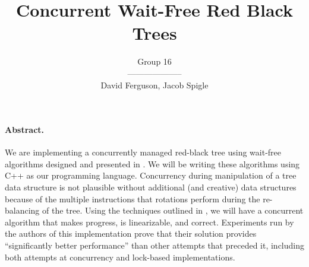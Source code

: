 \documentclass[12pt,a4paper]{article}
\author{Group 16 \\ -------------------- \\David Ferguson, Jacob Spigle}
\title{Concurrent Wait-Free Red Black Trees}
\begin{document}
	
\maketitle
\paragraph{\textbf{Abstract.}}
We are implementing a concurrently managed red-black tree using wait-free algorithms designed and presented in \cite{RedBlackDoc}. We will be writing these algorithms using C++ as our programming language.  Concurrency during manipulation of a tree data structure is not plausible without additional (and creative) data structures because of the multiple instructions that rotations perform during the re-balancing of the tree. Using the techniques outlined in \cite{RedBlackDoc}, we will have a concurrent algorithm that makes progress, is linearizable, and correct. Experiments run by the authors of this implementation prove that their solution provides ``significantly better performance''\cite{RedBlackDoc} than other attempts that preceded it, including both attempts at concurrency and lock-based implementations.
\end{document}
